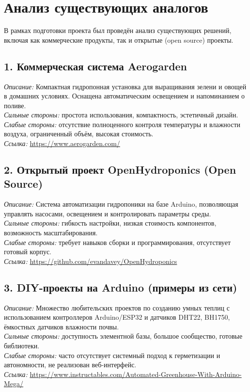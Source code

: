 \documentclass[a4paper,12pt]{article}
\begin{document}
\section*{Анализ существующих аналогов}
В рамках подготовки проекта был проведён анализ существующих решений, включая как коммерческие продукты, так и открытые (open source) проекты.

\subsection*{1. Коммерческая система Aerogarden}
\textit{Описание:} Компактная гидропонная установка для выращивания зелени и овощей в домашних условиях. Оснащена автоматическим освещением и напоминанием о поливе. \\
\textit{Сильные стороны:} простота использования, компактность, эстетичный дизайн. \\
\textit{Слабые стороны:} отсутствие полноценного контроля температуры и влажности воздуха, ограниченный объём, высокая стоимость. \\
\textit{Ссылка:} \url{https://www.aerogarden.com/}

\subsection*{2. Открытый проект OpenHydroponics (Open Source)}
\textit{Описание:} Система автоматизации гидропоники на базе Arduino, позволяющая управлять насосами, освещением и контролировать параметры среды. \\
\textit{Сильные стороны:} гибкость настройки, низкая стоимость компонентов, возможность масштабирования. \\
\textit{Слабые стороны:} требует навыков сборки и программирования, отсутствует готовый корпус. \\
\textit{Ссылка:} \url{https://github.com/evandavey/OpenHydroponics}

\subsection*{3. DIY-проекты на Arduino (примеры из сети)}
\textit{Описание:} Множество любительских проектов по созданию умных теплиц с использованием контроллеров Arduino/ESP32 и датчиков DHT22, BH1750, ёмкостных датчиков влажности почвы. \\
\textit{Сильные стороны:} доступность элементной базы, большое сообщество, готовые библиотеки. \\
\textit{Слабые стороны:} часто отсутствует системный подход к герметизации и автономности, не реализован веб-интерфейс. \\
\textit{Ссылка:} \url{https://www.instructables.com/Automated-Greenhouse-With-Arduino-Mega/}
\end{document}
